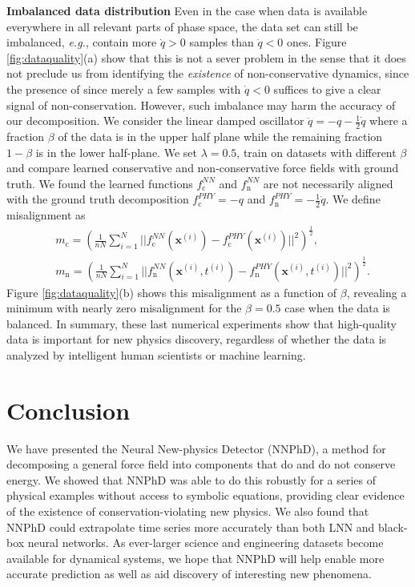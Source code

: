 \documentclass[aps,pre,reprint,superscriptaddress,nofootinbib,amsmath,amssymb]{revtex4-2}
\def\eg{{\frenchspacing\it e.g.}}
\newcommand{\mat}[1]{\mathbf{#1}}
\newcommand{\x}{\mat{x}}
\begin{document}
{\bf Imbalanced data distribution} Even in the case when data is available everywhere in all relevant parts of phase space, the data set can still be imbalanced, \eg, contain more $\dot{q}>0$ samples than $\dot{q}<0$ ones. Figure \ref{fig:dataquality}(a) show that this is not a sever problem in the sense that it does not preclude us from identifying the \textit{existence} of non-conservative dynamics, since the presence of since merely a few samples with $\dot{q}<0$ suffices to give a clear signal of non-conservation. However, such imbalance may harm the accuracy of our decomposition. We consider the linear damped oscillator $\ddot{q}=-q-\frac{1}{2}\dot{q}$ where a fraction $\beta$ of the data is in the upper half plane while the remaining fraction $1-\beta$ is in the lower half-plane. We set $\lambda=0.5$, train on datasets with different $\beta$ and compare learned conservative and non-conservative force fields with ground truth. We found the learned functions $f_{\mathrm{c}}^{NN}$ and $f_{\mathrm{n}}^{NN}$ are not necessarily aligned with the ground truth decomposition  $f_{\mathrm{c}}^{PHY}=-q$ and $f_{\mathrm{n}}^{PHY}=-\frac{1}{2}\dot{q}$. 
We define misalignment as
\begin{equation}
    \begin{aligned}
      &m_{\mathrm{c}}=(\frac{1}{nN}\sum_{i=1}^N ||f_{\mathrm{c}}^{NN}(\x^{(i)})-f_{\mathrm{c}}^{PHY}(\x^{(i)})||^2)^{\frac{1}{2}},\\
      &m_{\mathrm{n}}=(\frac{1}{nN}\sum_{i=1}^N ||f_{\mathrm{n}}^{NN}(\x^{(i)},t^{(i)})-f_{\mathrm{n}}^{PHY}(\x^{(i)},t^{(i)})||^2)^{\frac{1}{2}}.
    \end{aligned}
\end{equation}
Figure \ref{fig:dataquality}(b)  shows this misalignment as a function of $\beta$, revealing a minimum with nearly zero  misalignment for the $\beta=0.5$ case when the data is balanced.
In summary, these last numerical experiments show that 
high-quality data is important for new physics discovery, regardless of whether the data is analyzed by intelligent human scientists or machine learning.

\section{Conclusion}\label{sec:conclusion}
We have presented the Neural New-physics Detector (NNPhD), a method for decomposing a general force field into components that do and do not conserve energy. We showed that NNPhD was able to do this robustly for a series of physical examples without access to symbolic equations, providing clear evidence of the existence of conservation-violating new physics. We also found that NNPhD could extrapolate time series more accurately than both LNN and black-box neural networks.
As ever-larger science and engineering datasets become available for dynamical systems, we hope that NNPhD will help enable more accurate prediction as well as aid discovery of interesting new phenomena.
\end{document}
